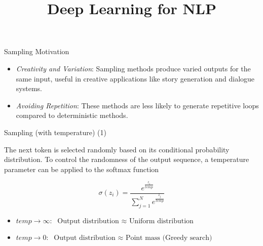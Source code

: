 \documentclass[11pt,compress,t,notes=noshow, xcolor=table]{beamer}
\title{Deep Learning for NLP}
\begin{document}


\begin{vbframe}{Sampling Motivation}

\vfill
    
\begin{itemize}
    \item \textit{Creativity and Variation}: Sampling methods produce varied outputs for the same input, useful in creative applications like story generation and dialogue systems.
    \item \textit{Avoiding Repetition}: These methods are less likely to generate repetitive loops compared to deterministic methods.
\end{itemize}

\vfill

\end{vbframe}


\begin{vbframe}{Sampling (with temperature) (1)}



The next token is selected randomly based on its conditional probability distribution. To control the randomness of the output sequence, a temperature parameter can be applied to the softmax function

\vfill 

$$
\sigma\left(z_i\right)=\frac{e^{\frac{z_i}{temp}}}{\sum_{j=1}^N e^{\frac{z_j}{temp}}}
$$

\vfill

\begin{itemize}
\item $temp \rightarrow \infty: \text{ Output distribution $\approx$ Uniform distribution}$
\item $temp \rightarrow 0: \text{ Output distribution $\approx$ Point mass (Greedy search) }$
\end{itemize}



\end{vbframe}
\end{document}
